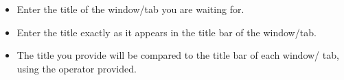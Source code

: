 
\begin{itemize}
\item Enter the title of the window/tab you are waiting for. 
\item Enter the title exactly as it appears in the title bar of the window/tab.
\item The title you provide will be compared to the title bar of each window/
tab, using the operator provided.
\end{itemize}
